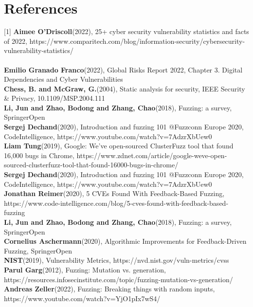 \documentclass[journal=tosc,final]{iacrtrans}
\begin{document}
\section{References}
[1] \textbf{Aimee O'Driscoll}(2022), 25+ cyber security vulnerability statistics and facts of 2022, https://www.comparitech.com/blog/information-security/cybersecurity-vulnerability-statistics/\\
\\
\noindent[2] \textbf{Emilio Granado Franco}(2022),  Global Risks Report 2022, Chapter 3. Digital Dependencies and Cyber Vulnerabilities\\

\noindent[3] \textbf{Chess, B. and McGraw, G.}(2004), Static analysis for security, IEEE Security \& Privacy, 10.1109/MSP.2004.111
\\


\noindent[4] \textbf{Li, Jun and Zhao, Bodong and Zhang, Chao}(2018),     Fuzzing: a survey, SpringerOpen
\\

\noindent [5] \textbf{Sergej Dechand}(2020), Introduction and fuzzing 101 @Fuzzconn Europe 2020, CodeIntelligence, https://www.youtube.com/watch?v=7AdzrXbUew0
\\

\noindent [6] \textbf{Liam Tung}(2019),  Google: We've open-sourced ClusterFuzz tool that found 16,000 bugs in Chrome, https://www.zdnet.com/article/google-weve-open-sourced-clusterfuzz-tool-that-found-16000-bugs-in-chrome/
\\

\noindent [7] \textbf{Sergej Dechand}(2020), Introduction and fuzzing 101 @Fuzzconn Europe 2020, CodeIntelligence, https://www.youtube.com/watch?v=7AdzrXbUew0
\\

\noindent[8] \textbf{Jonathan Reimer}(2020), 5 CVEs Found With Feedback-Based Fuzzing, https://www.code-intelligence.com/blog/5-cves-found-with-feedback-based-fuzzing
\\

\noindent[9] \textbf{Li, Jun and Zhao, Bodong and Zhang, Chao}(2018),     Fuzzing: a survey, SpringerOpen
\\


\noindent[10] \textbf{Cornelius Aschermann}(2020), Algorithmic Improvements for
Feedback-Driven Fuzzing, SpringerOpen
\\

\noindent[11] \textbf{NIST}(2019), Vulnerability Metrics, https://nvd.nist.gov/vuln-metrics/cvss
\\

\noindent[12] \textbf{Parul Garg}(2012), Fuzzing: Mutation vs. generation, https://resources.infosecinstitute.com/topic/fuzzing-mutation-vs-generation/
\\

\noindent[13] \textbf{Andreas Zeller}(2022), Fuzzing: Breaking things with random inputs, https://www.youtube.com/watch?v=YjO1pIx7wS4/
\\
\end{document}
